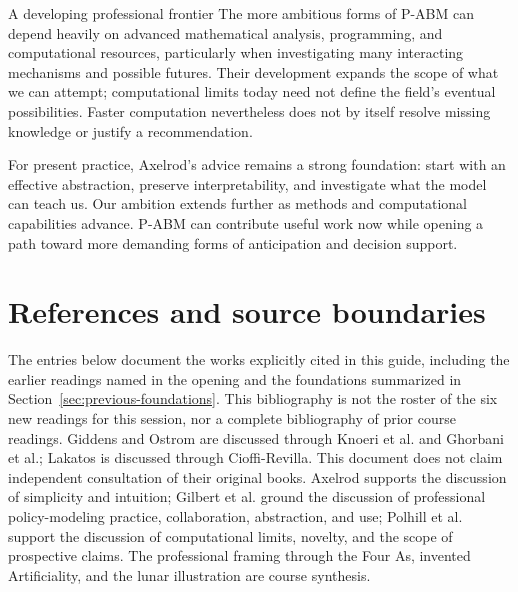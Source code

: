 \documentclass[11pt,a4paper]{article}
\begin{document}
\begin{principle}{A developing professional frontier}
The more ambitious forms of P-ABM can depend heavily on advanced mathematical analysis, programming, and computational resources, particularly when investigating many interacting mechanisms and possible futures. Their development expands the scope of what we can attempt; computational limits today need not define the field's eventual possibilities. Faster computation nevertheless does not by itself resolve missing knowledge or justify a recommendation.

For present practice, Axelrod's advice remains a strong foundation: start with an effective abstraction, preserve interpretability, and investigate what the model can teach us. Our ambition extends further as methods and computational capabilities advance. P-ABM can contribute useful work now while opening a path toward more demanding forms of anticipation and decision support.
\end{principle}

\clearpage
\section*{References and source boundaries}
The entries below document the works explicitly cited in this guide, including the earlier readings named in the opening and the foundations summarized in Section~\ref{sec:previous-foundations}. This bibliography is not the roster of the six new readings for this session, nor a complete bibliography of prior course readings. Giddens and Ostrom are discussed through Knoeri et al. and Ghorbani et al.; Lakatos is discussed through Cioffi-Revilla. This document does not claim independent consultation of their original books. Axelrod supports the discussion of simplicity and intuition; Gilbert et al. ground the discussion of professional policy-modeling practice, collaboration, abstraction, and use; Polhill et al. support the discussion of computational limits, novelty, and the scope of prospective claims. The professional framing through the Four As, invented Artificiality, and the lunar illustration are course synthesis.
\end{document}
